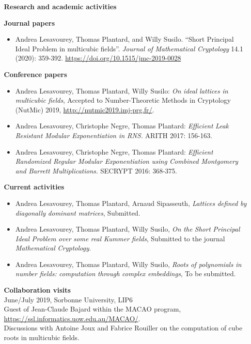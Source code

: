\documentclass[a4paper,12pt,final]{memoir}
\newcommand{\Sep}{\vspace{1.5em}}
\newcommand{\SmallSep}{\vspace{0.5em}}
\newcommand{\CVSection}[1]
{\Large\textbf{#1}\par
  \SmallSep\normalsize\normalfont}
\newcommand{\CVItem}[1]
{\textbf{\color{RoyalBlue} #1}}
\begin{document}
\Sep

\CVSection{Research and academic activities}

\CVItem{Journal papers}
\begin{itemize}
\item  Andrea Lesavourey, Thomas Plantard, and Willy Susilo. ``Short Principal Ideal Problem in multicubic fields''. \textit{Journal of Mathematical Cryptology} 14.1 (2020): 359-392. \url{https://doi.org/10.1515/jmc-2019-0028}
\end{itemize}

\CVItem{Conference papers}

\begin{itemize}
\item Andrea Lesavourey, Thomas Plantard, Willy Susilo:  \textit{On ideal lattices in multicubic fields},  Accepted to Number-Theoretic Methods in  Cryptology (NutMic) 2019, \url{http://nutmic2019.imj-prg.fr/}.
\item Andrea Lesavourey, Christophe Negre, Thomas Plantard:  \textit{Efficient Leak Resistant Modular Exponentiation in RNS.} ARITH 2017: 156-163.
\item Andrea Lesavourey, Christophe Negre, Thomas Plantard:  \textit{Efficient Randomized Regular Modular Exponentiation using Combined Montgomery and Barrett Multiplications.} SECRYPT 2016: 368-375.
\end{itemize}

\CVItem{Current activities}
\begin{itemize}
\item Andrea Lesavourey, Thomas Plantard, Arnaud Sipasseuth,  \textit{Lattices defined by diagonally dominant matrices},  Submitted.
\item Andrea Lesavourey, Thomas Plantard, Willy Susilo,  \textit{On the Short Principal Ideal Problem over some real Kummer fields}, Submitted to the journal \emph{Mathematical Cryptology}.
\end{itemize}  
  \clearpage
\framebreak
\framebreak
\begin{itemize}
\item Andrea Lesavourey, Thomas Plantard, Willy Susilo, \emph{Roots of polynomials in number fields: computation through complex embeddings}, To be submitted.
\end{itemize}


\CVItem{Collaboration visits} \\
June/July 2019, Sorbonne University, LIP6\\
Guest of Jean-Claude Bajard within the MACAO program, \url{https://ssl.informatics.uow.edu.au/MACAO/}. \\
Discussions with Antoine Joux and Fabrice Rouiller on the computation of cube roots in multicubic fields. \\
\end{document}
